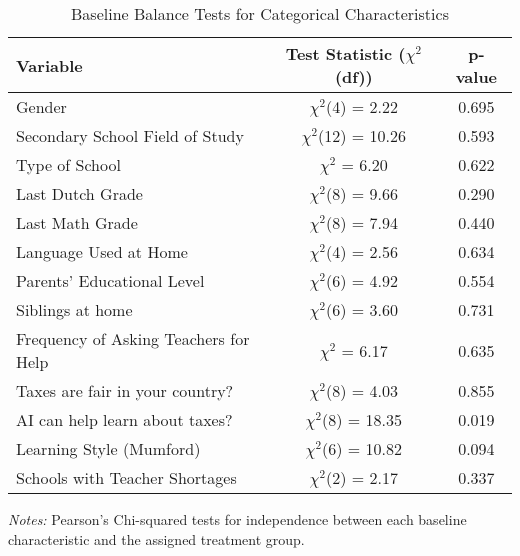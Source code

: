 \begin{table}[htbp]
\centering
\begin{threeparttable}
\caption{Baseline Balance Tests for Categorical Characteristics}
\label{tab:baseline_balance_cat_detailed}
\scriptsize
\begin{tabular}{@{}lcc@{}}
\toprule
Variable & Test Statistic ($\chi^2$(df)) & p-value \\
\midrule
Gender & $\chi^2$(4) = 2.22 & 0.695  \\
Secondary School Field of Study & $\chi^2$(12) = 10.26 & 0.593  \\
Type of School & $\chi^2$ = 6.20 & 0.622  \\
Last Dutch Grade & $\chi^2$(8) = 9.66 & 0.290  \\
Last Math Grade & $\chi^2$(8) = 7.94 & 0.440  \\
Language Used at Home & $\chi^2$(4) = 2.56 & 0.634  \\
Parents' Educational Level & $\chi^2$(6) = 4.92 & 0.554  \\
Siblings at home & $\chi^2$(6) = 3.60 & 0.731  \\
Frequency of Asking Teachers for Help & $\chi^2$ = 6.17 & 0.635  \\
Taxes are fair in your country? & $\chi^2$(8) = 4.03 & 0.855  \\
AI can help learn about taxes? & $\chi^2$(8) = 18.35 & 0.019  \\
Learning Style (Mumford) & $\chi^2$(6) = 10.82 & 0.094  \\
Schools with Teacher Shortages & $\chi^2$(2) = 2.17 & 0.337  \\
\bottomrule
\end{tabular}
\begin{tablenotes}
  \item[] \textit{Notes:} Pearson's Chi-squared tests for independence between each baseline characteristic and the assigned treatment group.
\end{tablenotes}
\end{threeparttable}
\end{table}
